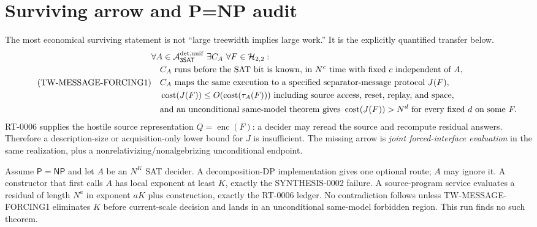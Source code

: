 \documentclass[11pt]{article}
\newcommand{\SAT}{\mathsf{3SAT}}
\newcommand{\enc}{\operatorname{enc}}
\begin{document}
\section{Surviving arrow and P=NP audit}
The most economical surviving statement is not ``large treewidth implies
large work.''  It is the explicitly quantified transfer below.
\[
\tag{TW-MESSAGE-FORCING1}
\begin{split}
&\forall A\in\mathcal A_{\SAT}^{\rm det,unif}\ \exists C_A\ \forall
F\in\mathcal H_{2,2}:\\
&\quad C_A\text{ runs before the SAT bit is known, in }N^{c}\text{ time
with fixed }c\text{ independent of }A,\\
&\quad C_A\text{ maps the same execution to a specified separator-message
protocol }J(F),\\
&\quad \operatorname{cost}(J(F))\le O(\operatorname{cost}(\tau_A(F)))
\text{ including source access, reset, replay, and space},\\
&\quad \text{and an unconditional same-model theorem gives }
\operatorname{cost}(J(F))>N^d\text{ for every fixed }d
\text{ on some }F.
\end{split}
\]
RT-0006 supplies the hostile source representation $Q=\enc(F)$: a decider
may reread the source and recompute residual answers.  Therefore a
description-size or acquisition-only lower bound for $J$ is insufficient.
The missing arrow is \emph{joint forced-interface evaluation} in the same
realization, plus a nonrelativizing/nonalgebrizing unconditional endpoint.

Assume $\mathsf P=\mathsf{NP}$ and let $A$ be an $N^K$ SAT decider.  A
decomposition-DP implementation gives one optional route; $A$ may ignore it.
A constructor that first calls $A$ has local exponent at least $K$, exactly
the SYNTHESIS-0002 failure.  A source-program service evaluates a residual of
length $N^a$ in exponent $aK$ plus construction, exactly the RT-0006 ledger.
No contradiction follows unless TW-MESSAGE-FORCING1 eliminates $K$ before
current-scale decision and lands in an unconditional same-model forbidden
region.  This run finds no such theorem.
\end{document}
